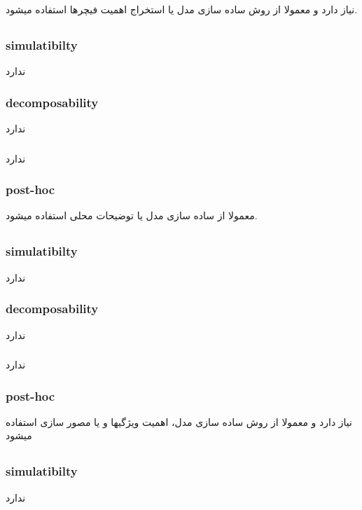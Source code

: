 \documentclass{article}[12pt]
\begin{document}
نیاز دارد و معمولا از روش ساده سازی مدل یا استخراج اهمیت فیچرها استفاده میشود.

\subsection{}

\subsubsection{simulatibilty}
ندارد
\subsubsection{decomposability}
ندارد
\subsubsection{}
ندارد
\subsubsection{post-hoc}
معمولا از ساده سازی مدل یا توضیحات محلی استفاده میشود. 
\subsection{}
\subsubsection{simulatibilty}
ندارد
\subsubsection{decomposability}
ندارد

\subsubsection{}
ندارد
\subsubsection{post-hoc}
نیاز دارد و معمولا از روش ساده سازی مدل، اهمیت ویژگیها و یا مصور سازی استفاده میشود

\subsection{}
\subsubsection{simulatibilty}
ندارد
\end{document}
